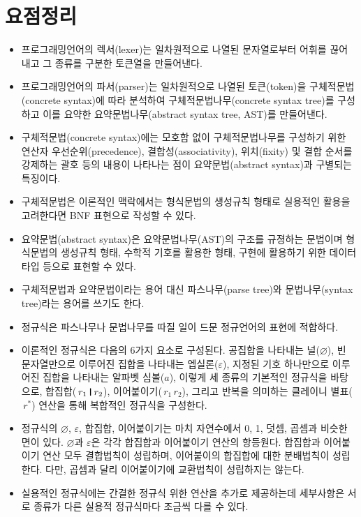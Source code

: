 \documentclass[b5paper,chapter,figtabcapt]{oblivoir}
\newcommand{\VERT}{\ensuremath{\mathop{\!\resizebox{1.65ex}{.7em}{\texttt{|}}\!}}}
\begin{document}
\section*{요점정리}
\begin{itemize}
\item 프로그래밍언어의 렉서(lexer)는 일차원적으로 나열된 문자열로부터
      어휘를 끊어내고 그 종류를 구분한 토큰열을 만들어낸다.
\item 프로그래밍언어의 파서(parser)는 일차원적으로 나열된
      토큰(token)을 구체적문법(concrete syntax)에 따라 분석하여
      구체적문법나무(concrete syntax tree)를 구성하고 이를 요약한
      요약문법나무(abstract syntax tree, AST)를 만들어낸다.
\item 구체적문법(concrete syntax)에는 모호함 없이 구체적문법나무를
      구성하기 위한 연산자 우선순위(precedence), 결합성(associativity),
      위치(fixity) 및 결합 순서를 강제하는 괄호 등의 내용이 나타나는
      점이 요약문법(abstract syntax)과 구별되는 특징이다.
\item 구체적문법은 이론적인 맥락에서는 형식문법의 생성규칙 형태로
      실용적인 활용을 고려한다면 BNF 표현으로 작성할 수 있다.
\item 요약문법(abstract syntax)은 요약문법나무(AST)의 구조를 규졍하는
      문법이며 형식문법의 생성규칙 형태, 수학적 기호를 활용한 형태,
      구현에 활용하기 위한 데이터 타입 등으로 표현할 수 있다.
\item 구체적문법과 요약문법이라는 용어 대신 파스나무(parse tree)와
      문법나무(syntax tree)라는 용어를 쓰기도 한다.
\item 정규식은 파스나무나 문법나무를 따질 일이 드문 정규언어의 표현에 적합하다.
\item 이론적인 정규식은 다음의 6가지 요소로 구성된다.
      공집합을 나타내는 널($\varnothing$),
      빈 문자열만으로 이루어진 집합을 나타내는 엡실론($\varepsilon$),
      지정된 기호 하나만으로 이루어진 집합을 나타내는 알파벳 심볼($a$),
      이렇게 세 종류의 기본적인 정규식을 바탕으로, 합집합($\,r_1 \VERT r_2$),
      이어붙이기($\,r_1\,r_2$), 그리고 반복을 의미하는 클레이니 별표($\,r^{*}$) 연산을
      통해 복합적인 정규식을 구성한다.
\item 정규식의 $\varnothing$, $\varepsilon$, 합집합, 이어붙이기는 마치 자연수에서
      0, 1, 덧셈, 곱셈과 비슷한 면이 있다. $\varnothing$과 $\varepsilon$은
      각각 합집합과 이어붙이기 연산의 항등원다. 합집합과 이어붙이기 연산
      모두 결합법칙이 성립하며, 이어붙이의 합집합에 대한 분배법칙이 성립한다.
      다만, 곱셈과 달리 이어붙이기에 교환법칙이 성립하지는 않는다.
\item 실용적인 정규식에는 간결한 정규식 위한 연산을 추가로 제공하는데
      세부사항은 서로 종류가 다른 실용적 정규식마다 조금씩 다를 수 있다. 
\end{itemize}
\end{document}
